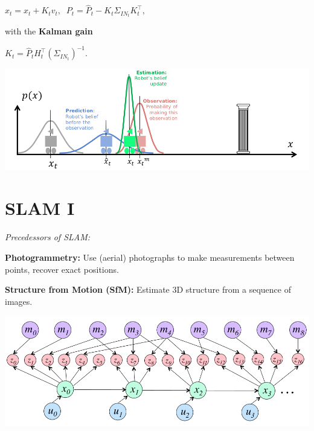 \documentclass[landscape]{article}
\newcommand{\vmspace}{\vspace{-7pt}}
\newcommand{\vpspace}{\vspace{5pt}}
\begin{document}
\begin{multicols}{3}
\begin{minipage}{\columnwidth}
\begin{compactenum}
    \begin{center}
      $
      x_t = \hat x_t + K_t v_t,\;\;
      P_t = \hat P_t - K_t \Sigma_{IN_t}K_t^\intercal,
      $
    \end{center}

    with the \textbf{Kalman gain}

    \begin{center}
      $
      K_t = \hat P_t H_t^\intercal (\Sigma_{IN_t})^{-1}.
      $
    \end{center}

  \end{compactenum}
  \includegraphics[width=\columnwidth]{img/9_Kalman.png}
\end{minipage}



\vfill


\section{SLAM I}

\vmspace

\begin{minipage}{\columnwidth}
  \textit{Precedessors of SLAM:}
  \begin{compactitem}
  \item \textbf{Photogrammetry:} Use (aerial) photographs to make measurements
    between points, recover exact positions.
  \item \textbf{Structure from Motion (SfM):} Estimate 3D structure from a
    sequence of images.
  \end{compactitem}
\end{minipage}

\vpspace

\includegraphics[width=\columnwidth]{img/10_SLAM.png}


\end{multicols}
\end{document}
